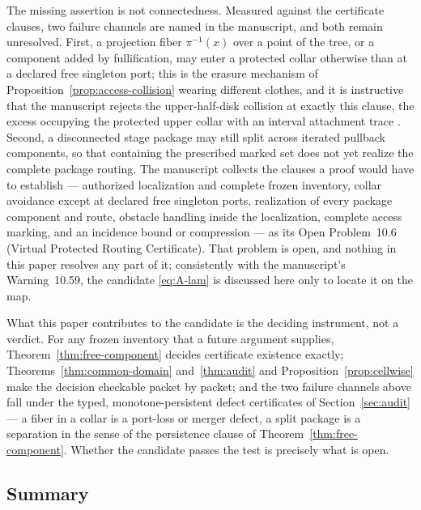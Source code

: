 \documentclass[11pt,reqno]{amsart}
\theoremstyle{definition}
\theoremstyle{remark}
\begin{document}
The missing assertion is not connectedness.  Measured against the
certificate clauses, two failure channels are named in the manuscript,
and both remain unresolved.  First, a projection fiber
$\pi^{-1}(x)$ over a point of the tree, or a component added by
fullification, may enter a protected collar otherwise than at a declared
free singleton port; this is the erasure mechanism of
Proposition~\ref{prop:access-collision} wearing different clothes, and
it is instructive that the manuscript rejects the upper-half-disk
collision at exactly this clause, the excess occupying the protected
upper collar with an interval attachment trace \cite{MWman}.  Second, a
disconnected stage package may still split across iterated pullback
components, so that containing the prescribed marked set does not yet realize
the complete package routing.  The manuscript collects the clauses a
proof would have to establish --- authorized localization and complete
frozen inventory, collar avoidance except at declared free singleton
ports, realization of every package component and route, obstacle
handling inside the localization, complete access marking, and an
incidence bound or compression --- as its Open Problem~10.6 (Virtual
Protected Routing Certificate).  That problem is open, and nothing in
this paper resolves any part of it; consistently with the manuscript's
Warning~10.59, the candidate \eqref{eq:A-lam} is discussed here only to
locate it on the map.

What this paper contributes to the candidate is the deciding instrument,
not a verdict.  For any frozen inventory that a future argument
supplies, Theorem~\ref{thm:free-component} decides certificate existence
exactly; Theorems~\ref{thm:common-domain} and~\ref{thm:audit} and
Proposition~\ref{prop:cellwise} make the decision checkable packet by
packet; and the two failure channels above fall under the typed,
monotone-persistent defect certificates of Section~\ref{sec:audit} ---
a fiber in a collar is a port-loss or merger defect, a split package is
a separation in the sense of the persistence clause of
Theorem~\ref{thm:free-component}.  Whether the candidate passes the test
is precisely what is open.

\subsection{Summary}
\label{subsec:A-comp-summary}
\end{document}
